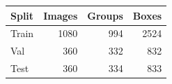 \begin{tabular}{lrrr}
\hline
Split & Images & Groups & Boxes \\
\hline
Train & 1080 & 994 & 2524 \\
Val & 360 & 332 & 832 \\
Test & 360 & 334 & 833 \\
\hline
\end{tabular}
